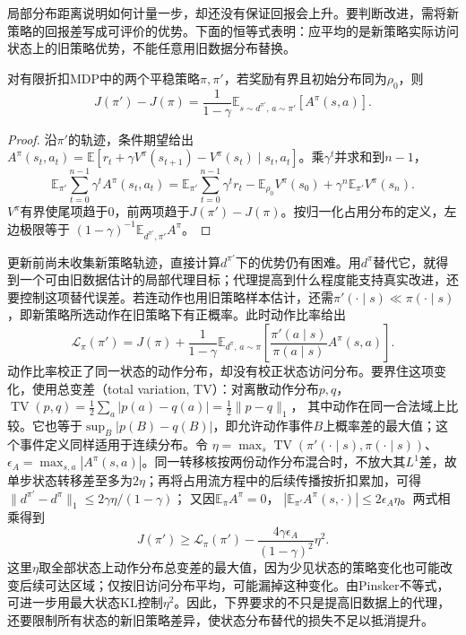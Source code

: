 局部分布距离说明如何计量一步，却还没有保证回报会上升。要判断改进，需将新策略的回报差写成可评价的优势。下面的恒等式表明：应平均的是新策略实际访问状态上的旧策略优势，不能任意用旧数据分布替换。

\begin{theorem}[折扣性能差恒等式]
  \label{thm:rl-learning-performance-difference}
  对有限折扣MDP中的两个平稳策略$\pi,\pi'$，若奖励有界且初始分布同为$\rho_0$，则
  \begin{equation}
    J(\pi')-J(\pi)
       =\frac{1}{1-\gamma}
          \mathbb E_{s\sim d^{\pi'},\,a\sim\pi'}[A^\pi(s,a)].
    \label{eq:rl-learning-performance-difference}
  \end{equation}
\end{theorem}
\begin{proof}
  沿$\pi'$的轨迹，条件期望给出
  $A^\pi(s_t,a_t)
    =\mathbb E[r_t+\gamma V^\pi(s_{t+1})-V^\pi(s_t)
                \mid s_t,a_t]$。乘$\gamma^t$并求和到$n-1$，
  \[
    \mathbb E_{\pi'}\sum_{t=0}^{n-1}\gamma^t A^\pi(s_t,a_t)
      =\mathbb E_{\pi'}\sum_{t=0}^{n-1}\gamma^t r_t
         -\mathbb E_{\rho_0}V^\pi(s_0)
         +\gamma^n\mathbb E_{\pi'}V^\pi(s_n).
  \]
  $V^\pi$有界使尾项趋于0，前两项趋于$J(\pi')-J(\pi)$。按归一化占用分布的定义，左边极限等于
  $(1-\gamma)^{-1}\mathbb E_{d^{\pi'},\pi'}A^\pi$。
\end{proof}

更新前尚未收集新策略轨迹，直接计算$d^{\pi'}$下的优势仍有困难。用$d^\pi$替代它，就得到一个可由旧数据估计的局部代理目标；代理提高到什么程度能支持真实改进，还要控制这项替代误差。若连动作也用旧策略样本估计，还需$\pi'(\cdot\mid s)\ll\pi(\cdot\mid s)$，即新策略所选动作在旧策略下有正概率。此时动作比率给出
\[
  \mathcal L_\pi(\pi')
    =J(\pi)+\frac1{1-\gamma}
         \mathbb E_{d^\pi,\,a\sim\pi}
           \left[\frac{\pi'(a\mid s)}{\pi(a\mid s)}
                         A^\pi(s,a)\right].
\]
动作比率校正了同一状态的动作分布，却没有校正状态访问分布。要界住这项变化，使用总变差（total variation, TV）：对离散动作分布$p,q$，
$\operatorname{TV}(p,q)=\tfrac12\sum_a|p(a)-q(a)|
=\tfrac12\lVert p-q\rVert_1$，
其中动作在同一合法域上比较。它也等于$\sup_B|p(B)-q(B)|$，即允许动作事件$B$上概率差的最大值；这个事件定义同样适用于连续分布。令
$\eta=\max_s\operatorname{TV}(\pi'(\cdot\mid s),\pi(\cdot\mid s))$、
$\epsilon_A=\max_{s,a}|A^\pi(s,a)|$。同一转移核按两份动作分布混合时，不放大其$L^1$差，故单步状态转移差至多为$2\eta$；再将占用流方程中的后续传播按折扣累加，可得
$\lVert d^{\pi'}-d^\pi\rVert_1\leq2\gamma\eta/(1-\gamma)$；
又因$\mathbb E_\pi A^\pi=0$，
$|\mathbb E_{\pi'}A^\pi(s,\cdot)|\leq2\epsilon_A\eta$。两式相乘得到
\begin{equation}
  J(\pi')\geq\mathcal L_\pi(\pi')
       -\frac{4\gamma\epsilon_A}{(1-\gamma)^2}\eta^2 .
  \label{eq:rl-learning-trpo-bound}
\end{equation}
这里$\eta$取全部状态上动作分布总变差的最大值，因为少见状态的策略变化也可能改变后续可达区域；仅按旧访问分布平均，可能漏掉这种变化。由Pinsker不等式，可进一步用最大状态KL控制$\eta^2$。因此，下界要求的不只是提高旧数据上的代理，还要限制所有状态的新旧策略差异，使状态分布替代的损失不足以抵消提升。

